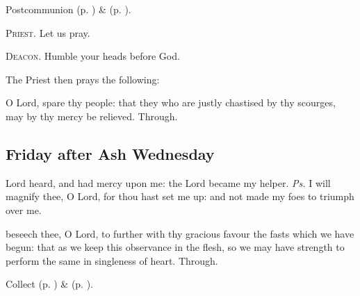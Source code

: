 \begin{rubric}
     Postcommunion  (p. \pageref{AshWednesdayMassPostcommunion}) \&   (p. \pageref{SPLivingDeparted}).
\end{rubric}

\textsc{Priest.} Let us pray.\par
\textsc{Deacon.} Humble your heads before God.\par
\begin{rubric}
    The Priest then prays the following:
\end{rubric}
 O Lord, spare thy people: that they who are justly chastised by thy scourges, may by thy mercy be relieved. Through.



\clearpage
\subsection{Friday after Ash Wednesday}

\introit
{} Lord heard, and had mercy upon me: the Lord became my helper. \textit{Ps.} I will magnify thee, O Lord, for thou hast set me up: and not made my foes to triumph over me.

\collect
{} beseech thee, O Lord, to further with thy gracious favour the fasts which we have begun: that as we keep this observance in the flesh, so we may have strength to perform the same in singleness of heart. Through.

\begin{rubric}
     Collect  (p. \pageref{AshWednesdayMassCollect}) \&   (p. \pageref{SPLivingDeparted}).
\end{rubric}

